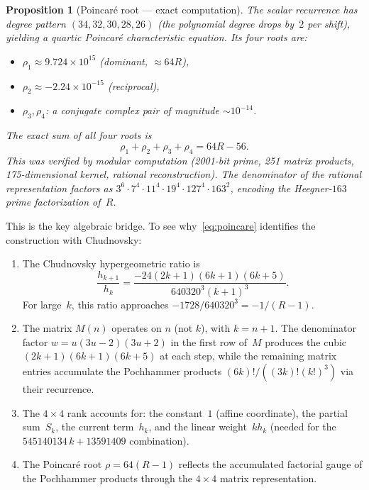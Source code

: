 \documentclass[11pt]{article}
\newtheorem{proposition}[theorem]{Proposition}
\begin{document}
\begin{proposition}[Poincar\'e root --- exact computation]
The scalar recurrence has degree pattern $(34, 32, 30, 28, 26)$
(the polynomial degree drops by~$2$ per shift), yielding a
quartic Poincar\'e characteristic equation.  Its four roots are:
\begin{itemize}
\item $\rho_1 \approx 9.724 \times 10^{15}$ (dominant, $\approx 64R$),
\item $\rho_2 \approx -2.24 \times 10^{-15}$ (reciprocal),
\item $\rho_3, \rho_4$: a conjugate complex pair of magnitude
  $\sim 10^{-14}$.
\end{itemize}

The \emph{exact} sum of all four roots is
\begin{equation}\label{eq:poincare}
\boxed{\rho_1 + \rho_2 + \rho_3 + \rho_4 = 64R - 56.}
\end{equation}
This was verified by modular computation (2001-bit prime,
251 matrix products, 175-dimensional kernel, rational
reconstruction).  The denominator of the rational representation
factors as $3^6 \cdot 7^4 \cdot 11^4 \cdot 19^4 \cdot 127^4
\cdot 163^2$, encoding the Heegner-$163$ prime factorization
of~$R$.
\end{proposition}

This is the key algebraic bridge.  To see why~\eqref{eq:poincare}
identifies the construction with Chudnovsky:

\begin{enumerate}
\item The Chudnovsky hypergeometric ratio is
\[
\frac{h_{k+1}}{h_k} = \frac{-24(2k+1)(6k+1)(6k+5)}{640320^3(k+1)^3}.
\]
For large~$k$, this ratio approaches $-1728/640320^3 = -1/(R-1)$.

\item The matrix $M(n)$ operates on $n$ (not $k$), with $k = n+1$.
The denominator factor $w = u(3u-2)(3u+2)$ in the first row of~$M$
produces the cubic $(2k+1)(6k+1)(6k+5)$ at each step, while the
remaining matrix entries accumulate the Pochhammer products
$(6k)!/((3k)!(k!)^3)$ via their recurrence.

\item The $4\times 4$ rank accounts for: the constant~$1$
(affine coordinate), the partial sum~$S_k$, the current
term~$h_k$, and the linear weight~$k h_k$ (needed for
the $545140134\,k + 13591409$ combination).

\item The Poincar\'e root $\rho = 64(R-1)$ reflects the
accumulated factorial gauge of the Pochhammer products
through the $4\times 4$ matrix representation.
\end{enumerate}
\end{document}
